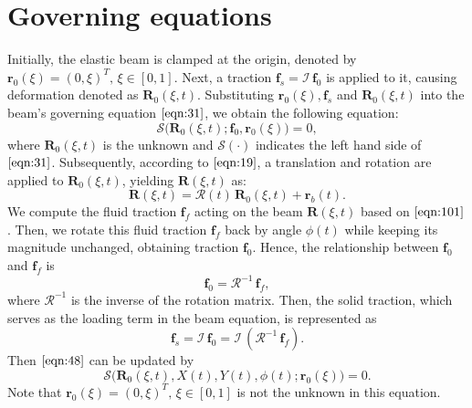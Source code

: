 \documentclass[a4paper,12pt]{report}
\begin{document}
\section{Governing equations}
Initially, the elastic beam is clamped at the origin, denoted by $\mathbf{r}_0(\xi)=(0,\xi)^T,\,\xi\in [0,1]$. Next, a traction $\mathbf{f}_s=\mathcal{I}\,\mathbf{f}_0$  is applied to it, causing deformation denoted as $\mathbf{R}_0(\xi,t)$. Substituting 
$\mathbf{r}_0(\xi), \mathbf{f}_s$ and $\mathbf{R}_0(\xi,t)$ into the beam's governing equation $\eqref{eqn:31}$, we obtain the following equation:
\begin{equation}
	\label{eqn:48}
	\mathbf{\mathcal{S}}\Big(\mathbf{R}_0(\xi,t);\mathbf{f}_0,\mathbf{r}_0(\xi)\Big)=0,
\end{equation}
where $\mathbf{R}_0(\xi,t)$ is the unknown and $\mathbf{\mathcal{S}}(\cdot)$ indicates the left hand side of $\eqref{eqn:31}$.
Subsequently, according to $\eqref{eqn:19}$, a translation and rotation are applied to 
$\mathbf{R}_0(\xi,t)$, yielding $\mathbf{R}(\xi,t)$ as:
\begin{equation}
	\label{eqn:49}
	\mathbf{R}(\xi,t)=\mathbf{\mathcal{R}}(t)\,\mathbf{R}_0(\xi,t)+\mathbf{r}_b(t).
\end{equation}
 We compute the fluid traction $\mathbf{f}_f$ acting on the beam $\mathbf{R}(\xi,t)$ based on $\eqref{eqn:101}$. Then, we rotate this fluid traction $\mathbf{f}_f$ back by angle $\phi(t)$ while keeping its magnitude unchanged, obtaining traction $\mathbf{f}_0$. Hence, the relationship between $\mathbf{f}_0$ and $\mathbf{f}_f$ is 
\begin{equation}
	\label{eqn:50}
	\mathbf{f}_0=\mathbf{\mathcal{R}}^{-1}\,\mathbf{f}_f,
\end{equation}
where $\mathbf{\mathcal{R}}^{-1}$ is the inverse of the rotation matrix. Then, the solid traction, which serves as the loading term in the beam equation, is represented as 
\begin{equation}
	\label{eqn:67}
	\mathbf{f}_s=\mathcal{I}\,\mathbf{f}_0=\mathcal{I}\,\left(\mathbf{\mathcal{R}}^{-1}\,\mathbf{f}_f\right).
\end{equation}
Then $\eqref{eqn:48}$ can be updated by
\begin{equation}
	\label{eqn:51}
	\mathbf{\mathcal{S}}\Big(\mathbf{R}_0(\xi,t), X(t), Y(t),\phi(t);\mathbf{r}_0(\xi)\Big)=0.
\end{equation}
Note that $\mathbf{r}_0(\xi)=(0,\xi)^T,\,\xi\in [0,1]$ is not the unknown in this equation.
\end{document}
